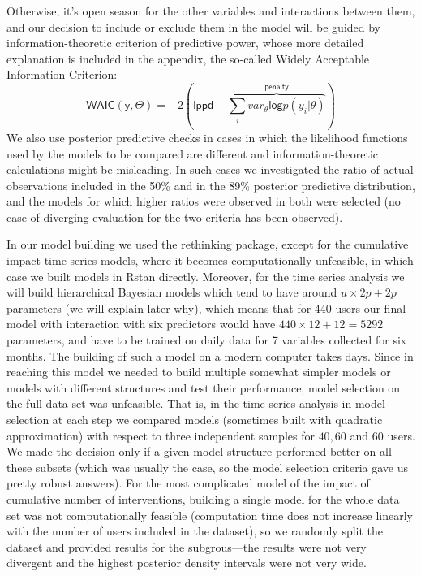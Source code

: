 \documentclass[preprint,12pt]{elsarticle}
\begin{document}
Otherwise, it's open season for the other variables and interactions
between them, and our decision to include or exclude them in the model
will be guided by information-theoretic criterion of predictive power, whose more detailed explanation is  included in the appendix, the so-called
Widely Acceptable Information Criterion:
\[
\mathsf{WAIC(y, \Theta)}  = -2 (\mathsf{lppd} - \overbrace{\sum_i var_\theta \mathsf{log} p (y_i \vert \theta)}^{\mathsf{penalty}})
\]
We also use  posterior predictive checks in cases in which the likelihood
functions used by the models to be compared are different and
information-theoretic calculations might be misleading. In such cases we
investigated the ratio of actual observations included in the 50\% and
in the 89\% posterior predictive distribution, and the models for which
higher ratios were observed in both were selected (no case of diverging
evaluation for the two criteria has been observed).

In our model building we used the \textsf{rethinking} package,
except for the cumulative impact time series models, where it becomes
computationally unfeasible, in which case we built models in
\textsf{Rstan} directly. Moreover, for the time series analysis we will
build hierarchical Bayesian models which tend to have around
\(u \times 2p + 2p\) parameters (we will explain later why), which means
that for 440 users our final model with interaction with six predictors
would have \(440 \times 12 + 12 = 5292\) parameters, and 
have to be trained on daily data for 7 variables collected for six months. The
building of such a model on a modern computer takes days. Since in
reaching this model we needed to build multiple somewhat simpler models
or models with different structures and test their performance, model
selection on the full data set was unfeasible. That is, in the time
series analysis in model selection at each step we compared models
(sometimes built with quadratic approximation) with respect to three
independent samples for \(40, 60\) and \(60\) users. We made the
decision only if a given model structure performed better on all these
subsets (which was usually the case, so the model selection criteria
gave us pretty robust answers). For the most complicated model of the
impact of cumulative number of interventions, building a single model
for the whole data set was not computationally feasible (computation
time does not increase linearly with the number of users included in the
dataset), so we randomly split the dataset 
and provided results for the subgrous---the results were not very divergent and the highest posterior density intervals were not very wide.
\end{document}
